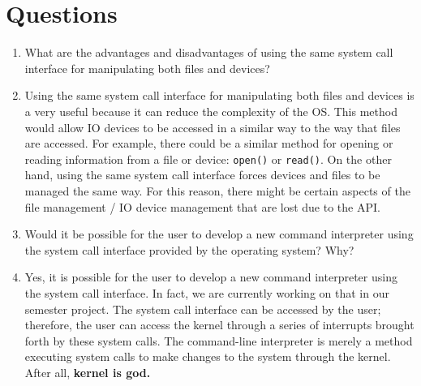 \tableofcontents 
\newpage

\section{Questions}
    \begin{enumerate}
        \item What are the advantages and disadvantages	of using the same system call interface for manipulating both files and devices?
        \item[] Using the same system call interface for manipulating both files and devices is a very useful because it can reduce the complexity of the OS. This method would allow IO devices to be accessed in a similar way to the way that files are accessed. For example, there could be a similar method for opening or reading information from a file or device: \texttt{open()} or \texttt{read()}. On the other hand, using the same system call interface forces devices and files to be managed the same way. For this reason, there might be certain aspects of the file management / IO device management that are lost due to the API.
        \item Would it be possible for the user to develop a new command interpreter using the system call interface provided by the operating system? Why?
        \item[] Yes, it is possible for the user to develop a new command interpreter using the system call interface. In fact, we are currently working on that in our semester project. The system call interface can be accessed by the user; therefore, the user can access the kernel through a series of interrupts brought forth by these system calls. The command-line interpreter is merely a method executing system calls to make changes to the system through the kernel. After all, \textbf{kernel is god.}
    \end{enumerate}


